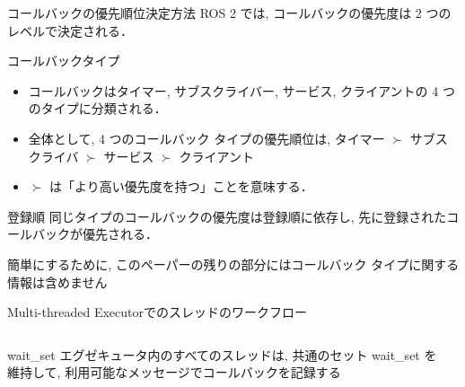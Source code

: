 \begin{frame}{コールバックの優先順位決定方法}
    ROS 2 では, コールバックの優先度は 2 つのレベルで決定される．

    \begin{block}{コールバックタイプ}
        \begin{itemize}
            \item コールバックはタイマー, サブスクライバー, サービス, クライアントの 4 つのタイプに分類される．
            \item 全体として, 4 つのコールバック タイプの優先順位は, タイマー $\succ$ サブスクライバ $\succ$ サービス $\succ$ クライアント
            \item $\succ$ は「より高い優先度を持つ」ことを意味する．
        \end{itemize}
    \end{block}

    \begin{block}{登録順}
        同じタイプのコールバックの優先度は登録順に依存し, 先に登録されたコールバックが優先される．
    \end{block}
\end{frame}

\begin{frame}{}
    簡単にするために, このペーパーの残りの部分にはコールバック タイプに関する情報は含めません
\end{frame}


\begin{frame}{Multi-threaded Executorでのスレッドのワークフロー}
    \begin{columns}
        \begin{column}{0.55\textwidth}
            \begin{block}{wait\_set}
                エグゼキュータ内のすべてのスレッドは, 共通のセット wait\_set を維持して, 利用可能なメッセージでコールバックを記録する
            \end{block}
        \end{column}
        \begin{column}{0.45\textwidth}
            \centering
            \vspace{\headerheight}
        \end{column}
    \end{columns}
\end{frame}

